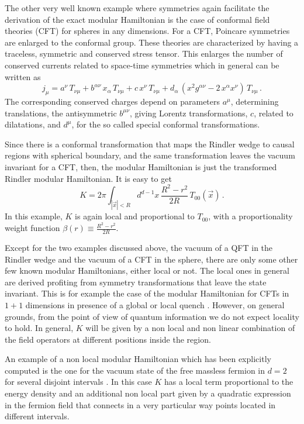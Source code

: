\documentclass[12pt,a4paper]{article}
\newcommand{\be}{\begin{equation}}
\newcommand{\ee}{\end{equation}}
\def\be{\begin{equation}}
\def\ee{\end{equation}}
\begin{document}
The other very well known example where symmetries again facilitate the derivation of the exact modular Hamiltonian is the case of conformal field theories (CFT)  for spheres in any dimensions.
For a CFT, Poincare symmetries are enlarged to the conformal group. These theories are characterized by having a traceless, symmetric and conserved stress tensor. This enlarges the number of conserved currents related to space-time symmetries which in general can be written as
\be  
j_\mu= a^\nu \,T_{\nu\mu} +  b^{\alpha \nu}\,x_\alpha\, T_{\nu\mu} + c\, x^\nu\, T_{\nu\mu} + d_\alpha\, (x^2 g^{\alpha\nu}-2\, x^\alpha x^\nu)\, T_{\nu\mu}\,.\label{das} 
\ee
The corresponding conserved charges depend on parameters $a^\mu$, determining translations, the antisymmetric $b^{\mu\nu}$, giving Lorentz transformations, $c$, related to dilatations, and $d^\mu$, for the so called special conformal transformations.   

Since there is a conformal transformation that maps the Rindler wedge to causal regions with spherical boundary, and the same transformation leaves the vacuum invariant for a CFT, then, the modular Hamiltonian is just the transformed Rindler  modular Hamiltonian. It is easy to  get
\be
K=2\pi \int_{|\vec{x}|<R} d^{d-1}x\, \frac{R^2-r^2}{2R}\, T_{00}(\vec{x})\,.\label{modesf}
\ee    
In this example, $K$ is again local and proportional to $T_{00}$, with a proportionality weight function $\beta(r)\equiv\frac{R^2-r^2}{2R}$.

Except for the two examples discussed above, the vacuum of a QFT in the Rindler wedge and the vacuum of a CFT in the sphere, there are only some other few known modular Hamiltonians, either local or not. The local ones in general are derived profiting from symmetry transformations that leave the state invariant. This is for example the case of the modular Hamiltonian for CFTs in $1+1$ dimensions in presence of a global
or local quench \cite{Cardy:2016fqc,Tonni:2017jom,DiGiulio:2019lpb,DiGiulio:2019cxv,Eisler:2020lyn,Mintchev:2020jhc,Mintchev:2020uom}.  
However, on general grounds, from the point of view of quantum information we do not expect locality to hold. In general, $K$ will be given by a non local
and non linear combination of the field operators at different positions inside the region.

An example of a non local modular
Hamiltonian which has been explicitly computed is the one for the vacuum state of the free massless fermion in $d = 2$ for several disjoint intervals
\cite{Casini:2009vk,Longo:2009mn,Wong:2018svs}. In this case $K$ has a local term proportional to the energy density and an additional non local part given by a quadratic expression in the fermion field that connects in a very particular way points located in different intervals.
\end{document}
